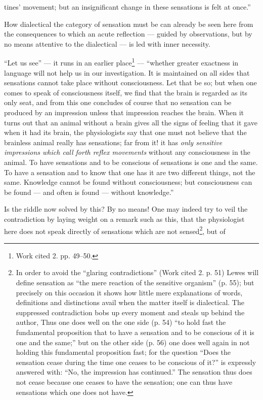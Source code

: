 \documentclass[12pt,a4paper]{book}
\begin{document}
\setcounter{footnote}{0}%
tines' movement; but an insignificant change in these sensations is felt at once.''

How dialectical the category of sensation must be can already be seen here from the
consequences to which an acute reflection --- guided by observations, but by no
means attentive to the dialectical --- is led with inner necessity.

``Let us see'' --- it runs in an earlier place\footnote{Work cited 2.
pp. 49--50.} --- ``whether greater exactness in language will not help us in our
investigation. It is maintained on all sides that sensations cannot take place
without consciousness. Let that be so; but when one comes to speak of consciousness
itself, we find that the brain is regarded as its only seat, and from this one
concludes of course that no sensation can be produced by an impression unless that
impression reaches the brain. When it turns out that an animal without a brain
gives all the signs of feeling that it gave when it had its brain, the
physiologists say that one must not believe that the brainless animal really has
sensations; far from it! it has \emph{only sensitive impressions which call forth
reflex movements} without any consciousness in the animal. To have sensations and
to be conscious of sensations is one and the same. To have a sensation and to know
that one has it are two different things, not the same. Knowledge cannot be found
without consciousness; but consciousness can be found --- and often is found ---
without knowledge.''

Is the riddle now solved by this? By no means! One may indeed try to veil the
contradiction by laying weight on a remark such as this, that the physiologist here
does not speak directly of sensations which are not sensed\footnote{In order to
avoid the ``glaring contradictions'' (Work cited 2. p. 51) Lewes will define
sensation as ``the mere reaction of the sensitive organism'' (p. 55); but precisely
on this occasion it
shows how little mere explanations of words, definitions and distinctions avail
when the matter itself is dialectical. The suppressed contradiction bobs up every
moment and steals up behind the author, Thus one does well on the
one side (p. 54) ``to hold fast the fundamental proposition that to have a
sensation and to be conscious of it is one and the same;'' but on the other side
(p. 56) one does well again in not holding this fundamental proposition fast; for
the question ``Does the sensation cease during the time one ceases to be conscious
of it?'' is expressly answered with: ``No, the impression has continued.'' The
sensation thus does not cease because one ceases to have the sensation; one can
thus have sensations which one does not have.}, but of
\end{document}

